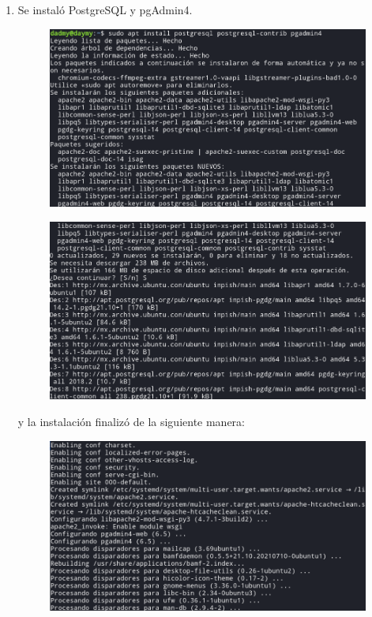 \documentclass{exam}
\begin{document}
\begin{enumerate}
\item Se instaló PostgreSQL y pgAdmin4.
\begin{figure}[h]
	\centering
    \includegraphics[width = 15cm]{imgNolasco/11.png}
\end{figure}
\newpage
\begin{figure}[h]
	\centering
    \includegraphics[width = 15cm]{imgNolasco/12.png}
\end{figure}
y la instalación finalizó de la siguiente manera:
\begin{figure}[h]
	\centering
    \includegraphics[width = 15cm]{imgNolasco/13.png}
\end{figure}



\end{enumerate}
\end{document}
